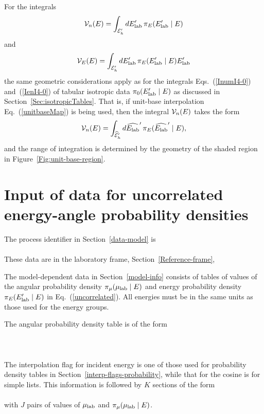 For the integrals
$$
  {\cal V}_n( E ) = \int_{{\cal E}_h' } dE_{\text{lab}}'   \, \pi_E(E_{\text{lab}}'   \mid E)
$$
and
$$
  {\cal V}_E( E ) = \int_{{\cal E}_h' } dE_{\text{lab}}'   \, \pi_E  (E_{\text{lab}}'   \mid E) E_{\text{lab}}'  
$$
the same geometric considerations apply as for the integrals Eqs.~(\ref{InumI4-0}) 
and~(\ref{IenI4-0}) of tabular isotropic data $\pi_0(E_{\text{lab}}'   \mid E)$
as discussed in Section~\ref{Sec:isotropicTables}.  That is, if unit-base interpolation
Eq.~(\ref{unitbaseMap}) is being used, then the integral ${\cal V}_n( E )$ takes the form
$$
  {\cal V}_n( E ) = \int_{\widehat{{\cal E}}_h' } d\widehat {E_{\text{lab}}}'   \, \pi_E(\widehat {E_{\text{lab}}}'   \mid E),
$$
and the range of integration is determined by the geometry of the
shaded region in Figure~\ref{Fig:unit-base-region}.

\section{Input of data for uncorrelated energy-angle probability densities}
The process identifier in Section~\ref{data-model} is\\
  \\
These data are in the laboratory frame, Section~\ref{Reference-frame},\\

The model-dependent data in Section~\ref{model-info}
consists of tables of values of 
the angular probability density $\pi_\mu(\mu_{\text{lab}}   \mid E)$ and energy 
probability density $\pi_E(E_{\text{lab}}'   \mid E)$ in
Eq.~(\ref{uncorrelated}).  All energies must be in the same units as
those used for the energy groups.

The angular probability density table is of the form\\
  \\
  \\
  \\
The interpolation flag for incident energy is one of those used for
probability density tables in Section~\ref{interp-flags-probability}, while that for
the cosine is for simple lists.  This information is followed
by $K$ sections of the form\\
  \\
with $J$ pairs of values of $\mu_{\text{lab}}$ and $\pi_\mu(\mu_{\text{lab}}   \mid E)$.

